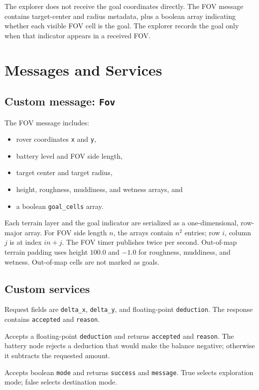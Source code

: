 \documentclass[11pt,a4paper]{article}
\begin{document}
The explorer does not receive the goal coordinates directly. The FOV message
contains target-center and radius metadata, plus a boolean array indicating
whether each visible FOV cell is the goal. The explorer records the goal only
when that indicator appears in a received FOV.

\section{Messages and Services}

\subsection{Custom message: \texttt{Fov}}

The FOV message includes:
\begin{itemize}
    \item rover coordinates \texttt{x} and \texttt{y},
    \item battery level and FOV side length,
    \item target center and target radius,
    \item height, roughness, muddiness, and wetness arrays, and
    \item a boolean \texttt{goal\_cells} array.
\end{itemize}

Each terrain layer and the goal indicator are serialized as a one-dimensional,
row-major array. For FOV side length \(n\), the arrays contain \(n^2\) entries;
row \(i\), column \(j\) is at index \(i n+j\). The FOV timer publishes twice
per second. Out-of-map terrain padding uses height \(100.0\) and \(-1.0\) for
roughness, muddiness, and wetness. Out-of-map cells are not marked as goals.

\subsection{Custom services}

\begin{description}[style=nextline,leftmargin=1.7em]
    \item[\texttt{Move}]
    Request fields are \texttt{delta\_x}, \texttt{delta\_y}, and floating-point
    \texttt{deduction}. The response contains \texttt{accepted} and
    \texttt{reason}.
    \item[\texttt{Battery}]
    Accepts a floating-point \texttt{deduction} and returns \texttt{accepted}
    and \texttt{reason}. The battery node rejects a deduction that would make
    the balance negative; otherwise it subtracts the requested amount.
    \item[\texttt{SwitchMode}]
    Accepts boolean \texttt{mode} and returns \texttt{success} and
    \texttt{message}. True selects exploration mode; false selects destination
    mode.
\end{description}
\end{document}
